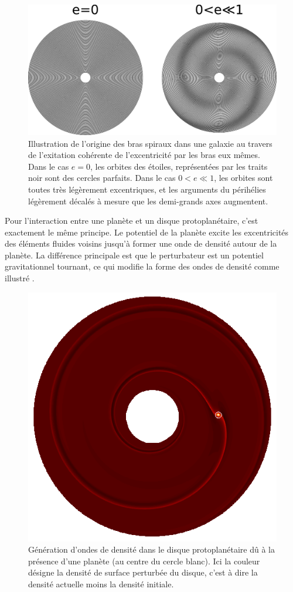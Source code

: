 \begin{figure}[htb]
\centering
\includegraphics[width=0.9\linewidth]{figure/spiral_arms.pdf}
\caption{Illustration de l'origine des bras spiraux dans une galaxie au travers de l'exitation cohérente de l'excentricité par les bras eux mêmes. Dans le cas \og $e=0$\fg, les orbites des étoiles, représentées par les traits noir sont des cercles parfaits. Dans le cas \og $0<e\ll 1$\fg, les orbites sont toutes très légèrement excentriques, et les arguments du périhélies légèrement décalés à mesure que les demi-grands axes augmentent.}\label{fig:spiral_arms}
\end{figure}

\bigskip

Pour l'interaction entre une planète et un disque protoplanétaire, c'est exactement le même principe. Le potentiel de la planète excite les excentricités des éléments fluides voisins jusqu'à former une onde de densité autour de la planète. La différence principale est que le perturbateur est un potentiel gravitationnel tournant, ce qui modifie la forme des ondes de densité comme illustré .

\begin{figure}[htb]
\centering
\includegraphics[width=0.6\linewidth]{figure/lindblad_torque.png}
\caption{Génération d'ondes de densité dans le disque protoplanétaire dû à la présence d'une planète (au centre du cercle blanc). Ici la couleur désigne la densité de surface perturbée du disque, c'est à dire la densité actuelle moins la densité initiale.}\label{fig:lindblad_torque}
\end{figure}


